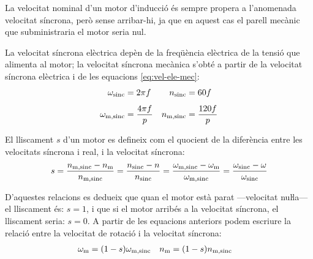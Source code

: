 La velocitat nominal d'un motor d'inducció és sempre propera a l'anomenada velocitat síncrona, però sense arribar-hi, ja que en aquest cas el parell mecànic que subministraria el motor seria nul.

La velocitat síncrona elèctrica depèn de la freqüència elèctrica de la tensió que alimenta al motor; la velocitat síncrona mecànica s'obté a partir de la velocitat síncrona elèctrica i de  les equacions \eqref{eq:vel-ele-mec}:
\begin{subequations}\index{motors d'inducció!velocitat síncrona}
\begin{align}
    \omega\ped{sinc} &= 2 \pi f & n\ped{sinc} &= 60 f \\[1ex]
    \omega\ped{m,sinc} &= \frac{4 \pi f}{p} & n\ped{m,sinc} &= \frac{120 f}{p}\label{eq:vel-mec-sinc}
\end{align}
\end{subequations}

El lliscament $s$ d'un motor es defineix com el quocient de la diferència entre les velocitats síncrona  i real, i la velocitat síncrona:
\begin{equation}\label{eq:lliscament}\index{lliscament}
    s = \frac{n\ped{m,sinc}-n\ped{m}}{n\ped{m,sinc}} =
    \frac{n\ped{sinc}-n}{n\ped{sinc}} =
    \frac{\omega\ped{m,sinc}-\omega\ped{m}}{\omega\ped{m,sinc}} =
    \frac{\omega\ped{sinc}-\omega}{\omega\ped{sinc}}
\end{equation}

D'aquestes relacions es dedueix que quan el motor està parat ---velocitat nuŀla--- el lliscament és: $s=1$, i que si el motor arribés a la velocitat síncrona, el lliscament seria: $s=0$. A partir de les equacions anteriors podem escriure la relació entre la velocitat de rotació i la velocitat síncrona:
\begin{align}
    \omega_\mathrm{m} &= (1-s) \omega_\mathrm{m,sinc} & n_\mathrm{m} &= (1-s) n_\mathrm{m,sinc} \label{eq:wm-wsinc}
\end{align}


